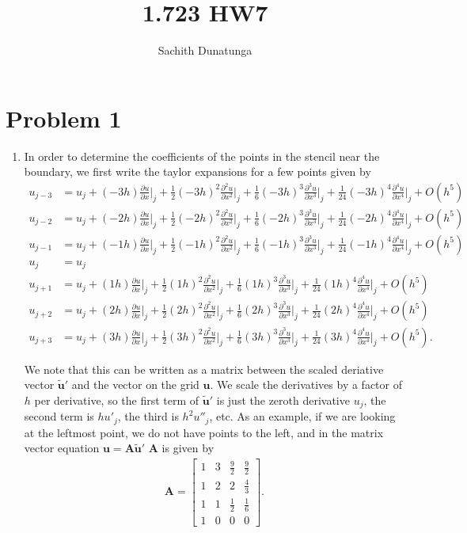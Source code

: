 \documentclass{article}
\title{1.723 HW7}
\author{Sachith  Dunatunga}
\begin{document}
\newcommand{\deriv}[2]{\frac{\partial #1}{ \partial #2}}
\newcommand{\nderiv}[3]{\frac{\partial^{#3} #1}{ \partial #2^{#3}}}
\newcommand{\dx}[1]{\deriv{#1}{x}}
\newcommand{\taylorexpf}[3]{#1_{#2} + \left(#3 \right) \dx{#1}\biggr\rvert_{#2} + \frac{1}{2}\left(#3 \right)^2 \nderiv{#1}{x}{2}\biggr\rvert_{#2} + \frac{1}{6}\left(#3 \right)^3\nderiv{#1}{x}{3}\biggr\rvert_{#2} + \frac{1}{24}\left(#3 \right)^4\nderiv{#1}{x}{4}\biggr\rvert_{#2} + O(h^5)}
\maketitle

\section{Problem 1}
\begin{enumerate}
\item
In order to determine the coefficients of the points in the stencil near the boundary, we first write the taylor expansions for a few points given by
\begin{align}
u_{j-3} &= \taylorexpf{u}{j}{-3h} \\
u_{j-2} &= \taylorexpf{u}{j}{-2h} \\
u_{j-1} &= \taylorexpf{u}{j}{-1h} \\
u_j &= u_j \\
u_{j+1} &= \taylorexpf{u}{j}{1h} \\
u_{j+2} &= \taylorexpf{u}{j}{2h} \\
u_{j+3} &= \taylorexpf{u}{j}{3h}.
\end{align}

We note that this can be written as a matrix between the scaled deriative vector $\mathbf{\tilde{u}'}$ and the vector on the grid $\mathbf{u}$.
We scale the derivatives by a factor of $h$ per derivative, so the first term of $\mathbf{\tilde{u}'}$ is just the zeroth derivative $u_j$, the second term is $h u'_j$, the third is $h^2 u''_j$, etc.
As an example, if we are looking at the leftmost point, we do not have points to the left, and in the matrix vector equation $\mathbf{u} = \mathbf{A} \mathbf{\tilde{u}'}$ $\mathbf{A}$ is given by
\begin{align}
\mathbf{A} = \begin{bmatrix}
1 & 3 & \frac{9}{2} & \frac{9}{2} \\
1 & 2 & 2 & \frac{4}{3} \\
1 & 1 & \frac{1}{2} & \frac{1}{6} \\
1 & 0 & 0 & 0
\end{bmatrix}.
\end{align}


\end{enumerate}
\end{document}

